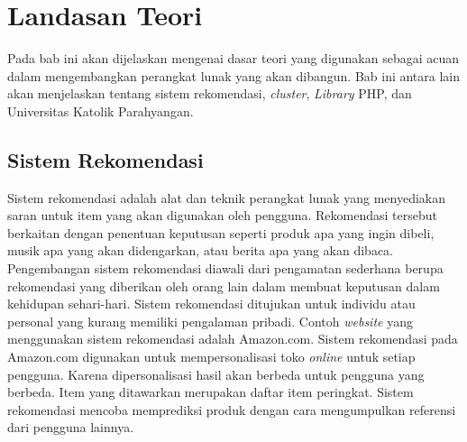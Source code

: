 \chapter{Landasan Teori}
\label{chap:landasan teori}

Pada bab ini akan dijelaskan mengenai dasar teori yang digunakan sebagai acuan dalam mengembangkan perangkat lunak yang akan dibangun. Bab ini antara lain akan menjelaskan tentang sistem rekomendasi, \textit{cluster}, \textit{Library} PHP, dan Universitas Katolik Parahyangan.

\section{Sistem Rekomendasi}
\label{sec:sistem rekomendasi}

Sistem rekomendasi \cite{buku:sistem:rekomendasi} adalah alat dan teknik perangkat lunak yang menyediakan saran untuk item yang akan digunakan oleh pengguna. Rekomendasi tersebut berkaitan dengan penentuan keputusan seperti produk apa yang ingin dibeli, musik apa yang akan didengarkan, atau berita apa yang akan dibaca. Pengembangan sistem rekomendasi \cite{buku:sistem:rekomendasi} diawali dari pengamatan sederhana berupa rekomendasi yang diberikan oleh orang lain dalam membuat keputusan dalam kehidupan sehari-hari. Sistem rekomendasi ditujukan untuk individu atau personal yang kurang memiliki pengalaman pribadi. Contoh \textit{website} yang menggunakan sistem rekomendasi adalah Amazon.com. Sistem rekomendasi pada Amazon.com digunakan untuk mempersonalisasi toko \textit{online} untuk setiap pengguna. Karena dipersonalisasi hasil akan berbeda untuk pengguna yang berbeda. Item yang ditawarkan merupakan daftar item peringkat. Sistem rekomendasi mencoba memprediksi produk dengan cara mengumpulkan referensi dari pengguna lainnya.


